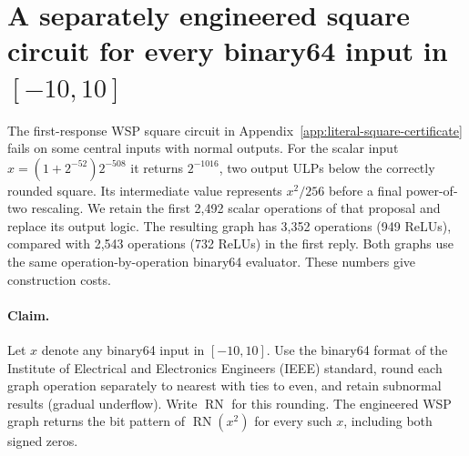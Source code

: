\section{A separately engineered square circuit for every binary64 input in $[-10,10]$}
\label{app:fullsquare}
The first-response WSP square circuit in Appendix~\ref{app:literal-square-certificate} fails on some central inputs with normal outputs.
For the scalar input $x=(1+2^{-52})2^{-508}$ it returns $2^{-1016}$, two output ULPs below the correctly rounded square.
Its intermediate value represents $x^2/256$ before a final power-of-two rescaling.
We retain the first 2,492 scalar operations of that proposal and replace its output logic.
The resulting graph has 3,352 operations (949 ReLUs), compared with 2,543 operations (732 ReLUs) in the first reply.
Both graphs use the same operation-by-operation binary64 evaluator. These numbers give construction costs.

\paragraph{Claim.}
Let $x$ denote any binary64 input in $[-10,10]$. Use the binary64 format of the Institute of Electrical and Electronics Engineers (IEEE) standard, round each graph operation separately to nearest with ties to even, and retain subnormal results (gradual underflow). Write $\operatorname{RN}$ for this rounding. The engineered WSP graph returns the bit pattern of $\operatorname{RN}(x^2)$ for every such $x$, including both signed zeros.

